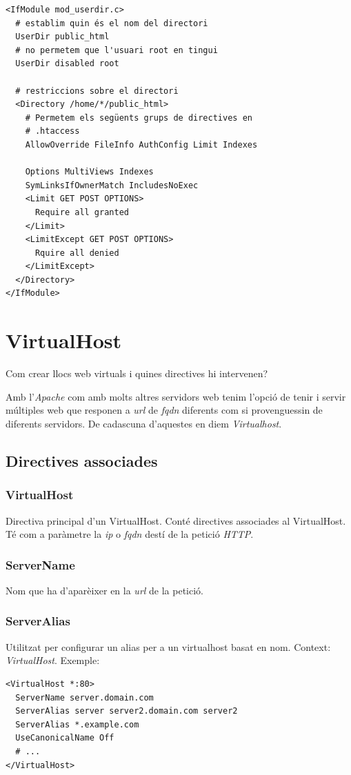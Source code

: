 \documentclass[a4paper, 11pt]{article}
\begin{document}
\begin{verbatim}
<IfModule mod_userdir.c>
  # establim quin és el nom del directori
  UserDir public_html
  # no permetem que l'usuari root en tingui
  UserDir disabled root

  # restriccions sobre el directori
  <Directory /home/*/public_html>
    # Permetem els següents grups de directives en 
    # .htaccess
    AllowOverride FileInfo AuthConfig Limit Indexes
    
    Options MultiViews Indexes 
    SymLinksIfOwnerMatch IncludesNoExec
    <Limit GET POST OPTIONS>
      Require all granted
    </Limit>
    <LimitExcept GET POST OPTIONS>
      Rquire all denied
    </LimitExcept>
  </Directory>
</IfModule>
\end{verbatim}

\section{VirtualHost}
Com crear llocs web virtuals i quines directives hi intervenen? 

Amb l'\textit{Apache} com amb molts altres servidors web tenim l'opció de tenir i servir múltiples web que responen a \textit{url} de \textit{fqdn} diferents com si provenguessin de diferents servidors. De cadascuna d'aquestes en diem \textit{Virtualhost}.
\subsection{Directives associades}
\subsubsection{VirtualHost}
Directiva principal d'un VirtualHost. Conté directives associades al VirtualHost. Té com a paràmetre la \textit{ip} o \textit{fqdn} destí de la petició \textit{HTTP}.
\subsubsection{ServerName}
Nom que ha d'aparèixer en la \textit{url} de la petició.
\subsubsection{ServerAlias}
Utilitzat per configurar un alias per a un virtualhost basat en nom. Context: \textit{VirtualHost}. Exemple:
\begin{verbatim}
<VirtualHost *:80>
  ServerName server.domain.com
  ServerAlias server server2.domain.com server2
  ServerAlias *.example.com
  UseCanonicalName Off
  # ...
</VirtualHost> 
\end{verbatim}
\end{document}
